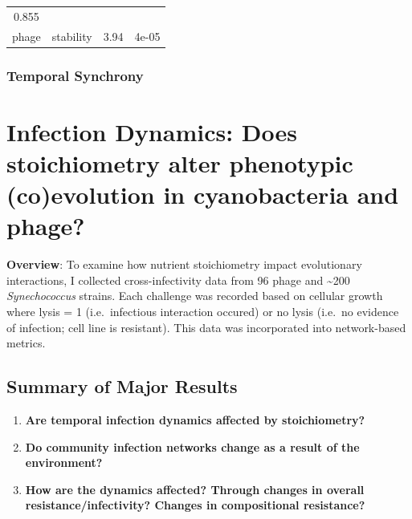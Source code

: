 \documentclass[]{article}
\providecommand{\tightlist}{%
  \setlength{\itemsep}{0pt}\setlength{\parskip}{0pt}}
\begin{document}
\begin{longtable}[]{@{}cccc@{}}
\begin{minipage}[t]{0.10\columnwidth}
0.855
\strut\end{minipage}\tabularnewline
\begin{minipage}[t]{0.12\columnwidth}\centering\strut
phage
\strut\end{minipage} &
\begin{minipage}[t]{0.14\columnwidth}\centering\strut
stability
\strut\end{minipage} &
\begin{minipage}[t]{0.06\columnwidth}\centering\strut
3.94
\strut\end{minipage} &
\begin{minipage}[t]{0.10\columnwidth}\centering\strut
4e-05
\strut\end{minipage}\tabularnewline
\bottomrule
\end{longtable}

\newpage

\subsubsection{Temporal Synchrony}\label{temporal-synchrony}

\section{Infection Dynamics: Does stoichiometry alter phenotypic
(co)evolution in cyanobacteria and
phage?}\label{infection-dynamics-does-stoichiometry-alter-phenotypic-coevolution-in-cyanobacteria-and-phage}

\textbf{Overview}: To examine how nutrient stoichiometry impact
evolutionary interactions, I collected cross-infectivity data from 96
phage and \textasciitilde{}200 \emph{Synechococcus} strains. Each
challenge was recorded based on cellular growth where lysis = 1
(i.e.~infectious interaction occured) or no lysis (i.e.~no evidence of
infection; cell line is resistant). This data was incorporated into
network-based metrics.

\subsection{Summary of Major Results}\label{summary-of-major-results-2}

\begin{enumerate}
\def\labelenumi{\arabic{enumi}.}
\tightlist
\item
  \textbf{Are temporal infection dynamics affected by stoichiometry?}
\item
  \textbf{Do community infection networks change as a result of the
  environment?}
\item
  \textbf{How are the dynamics affected? Through changes in overall
  resistance/infectivity? Changes in compositional resistance?}
\end{enumerate}
\end{document}
